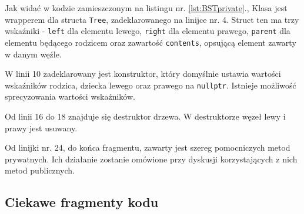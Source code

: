 Jak widać w kodzie zamieszczonym na listingu nr. \ref{lst:BSTprivate}., Klasa jest wrapperem dla structa \texttt{Tree}, zadeklarowanego na linijce nr. 4. Struct ten ma trzy wskaźniki - \texttt{left} dla elementu lewego, \texttt{right} dla elementu prawego, \texttt{parent} dla elementu będącego rodzicem oraz zawartość \texttt{contents}, opsującą element zawarty w danym węźle. 

W linii 10 zadeklarowany jest konstruktor, który domyślnie ustawia wartości wskaźników rodzica, dziecka lewego oraz prawego na \texttt{nullptr}. Istnieje możliwość sprecyzowania wartości wskaźników.

Od linii 16 do 18 znajduje się destruktor drzewa. W destruktorze węzeł lewy i prawy jest usuwany.

Od linijki nr. 24, do końca fragmentu, zawarty jest szereg pomocniczych metod prywatnych. Ich działanie zostanie omówione przy dyskusji korzystających z nich metod publicznych.

\subsection{Ciekawe fragmenty kodu}
